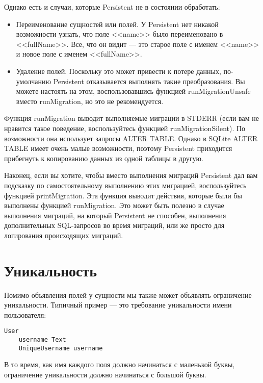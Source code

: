Однако есть и случаи, которые Persistent не в состоянии обработать:

\begin{itemize}
	\item Переименование сущностей или полей. У Persistent нет никакой возможности узнать, что поле <<name>> было переименовано в <<fullName>>. Все, что он видит --- это старое поле с именем <<name>> и новое поле с именем <<fullName>>.
	\item Удаление полей. Поскольку это может привести к потере данных, по-умолчанию Persistent отказывается выполнять такие преобразования. Вы можете настоять на этом, воспользовавшись функцией runMigrationUnsafe вместо runMigration, но это не рекомендуется.
\end{itemize}

Функция runMigration выводит выполняемые миграции в STDERR (если вам не нравится такое поведение, воспользуйтесь функцией runMigrationSilent). По возможности она использует запросы ALTER TABLE. Однако в SQLite ALTER TABLE имеет очень малые возможности, поэтому Persistent приходится прибегнуть к копированию данных из одной таблицы в другую.

Наконец, если вы хотите, чтобы вместо выполнения миграций Persistent дал вам подсказку по самостоятельному выполнению этих миграцией, воспользуйтесь функцией printMigration. Эта функция выводит действия, которые были бы выполнены функцией runMigration. Это может быть полезно в случае выполнения миграций, на который Persistent не способен, выполнения дополнительных SQL-запросов во время миграций, или же просто для логирования происходящих миграций.

\section{Уникальность} %

Помимо объявления полей у сущности мы также может объявлять ограничение уникальности. Типичный пример --- это требование уникальности имени пользователя:

\begin{lstlisting}
User
    username Text
    UniqueUsername username
\end{lstlisting}

В то время, как имя каждого поля должно начинаться с маленькой буквы, ограничение уникальности должно начинаться с большой буквы.

